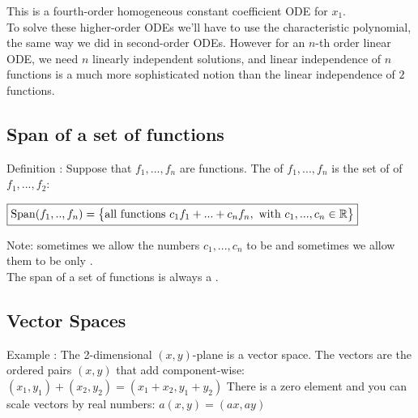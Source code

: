 \documentclass[11pt, openright]{book}
\begin{document}
This is a fourth-order homogeneous constant coefficient ODE for $x_1$.\\
To solve these higher-order ODEs we'll have to use the characteristic polynomial, the same way we did in second-order ODEs.
However for an $n$-th order linear ODE, we need $n$ linearly independent solutions, and linear independence of $n$ functions is a much more sophisticated notion than the linear independence of $2$ functions.

\subsection{Span of a set of functions}

\begin{dent}{Definition :}
    Suppose that $f_1,...,f_n$ are functions. The  of $f_1,...,f_n$ is the set of  of $f_1,...,f_2$:\\
    \centerline{\large$\boxed{\operatorname{Span}(f_1,..,f_n)=\bigl\{\text{all functions }c_1f_1+...+c_nf_n,\ \text{with } c_1,...,c_n\in \mathbb{R} \bigr\}}$}\vspace{-25pt}

    \begin{dent}{}

        Note: sometimes we allow the numbers $c_1,...,c_n$ to be  and sometimes we allow them to be only .\\
        The span of a set of functions is always a .
    \end{dent}

\end{dent}


\subsection{Vector Spaces}

\begin{dent}{Example :}
    The 2-dimensional $(x,y)$-plane is a vector space. The vectors are the ordered pairs $(x,y)$ that add component-wise: $(x_1,y_1)+(x_2,y_2)=(x_1+x_2,y_1+y_2)$ There is a zero element and you can scale vectors by real numbers: $a(x,y)=(ax,ay)$
\end{dent}
\end{document}
